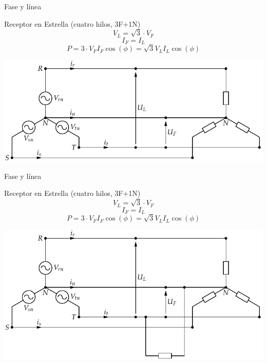 \documentclass[xcolor={usenames,svgnames,dvipsnames}]{beamer}
\begin{document}
\begin{frame}[label={sec:org76b7350}]{Fase y línea}
\begin{block}{Receptor en Estrella (cuatro hilos, 3F+1N)}
$$V_{L}=\sqrt{3}\cdot V_{F}$$ $$I_{F}=I_{L}$$
$$P=3\cdot V_{F}I_{F}\cos(\phi)=\sqrt{3}V_{L}I_{L}\cos(\phi)$$
\begin{center}
\includegraphics[width=.9\linewidth]{../figs/RedTrifasicaEstrella.pdf}
\end{center}
\end{block}
\end{frame}

\begin{frame}[label={sec:orgedb80c1}]{Fase y línea}
\begin{block}{Receptor en Estrella (cuatro hilos, 3F+1N)}
$$V_{L}=\sqrt{3}\cdot V_{F}$$ $$I_{F}=I_{L}$$
$$P=3\cdot V_{F}I_{F}\cos(\phi)=\sqrt{3}V_{L}I_{L}\cos(\phi)$$
\begin{center}
\includegraphics[width=.9\linewidth]{../figs/RedTrifasicaEstrella_CargaMonofasica.pdf}
\end{center}
\end{block}
\end{frame}
\end{document}

